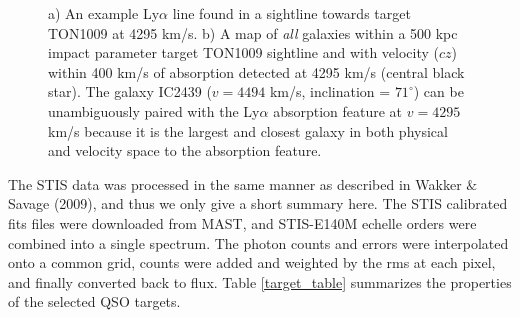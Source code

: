 \documentclass[iop]{emulateapj-rtx4}
\begin{document}
\begin{figure}[ht!]
  \caption{\small{a) An example Ly$\alpha$ line found in a sightline towards target TON1009 at 4295 km/s. b) A map of \textit{all} galaxies within a 500 kpc impact parameter target TON1009 sightline and with velocity ($cz$) within 400 km/s of absorption detected at 4295 km/s (central black star). The galaxy IC2439 ($v=4494$ km/s, inclination = $71^{\circ}$) can be unambiguously paired with the Ly$\alpha$ absorption feature at $v=4295$ km/s because it is the largest and closest galaxy in both physical and velocity space to the absorption feature.}}
\vspace{5pt}
\end{figure}

The STIS data was processed in the same manner as described in Wakker $\&$ Savage (2009), and thus we only give a short summary here. The STIS calibrated fits files were downloaded from MAST, and STIS-E140M echelle orders were combined into a single spectrum. The photon counts and errors were interpolated onto a common grid, counts were added and weighted by the rms at each pixel, and finally converted back to flux. Table \ref{target_table} summarizes the properties of the selected QSO targets.
\end{document}
